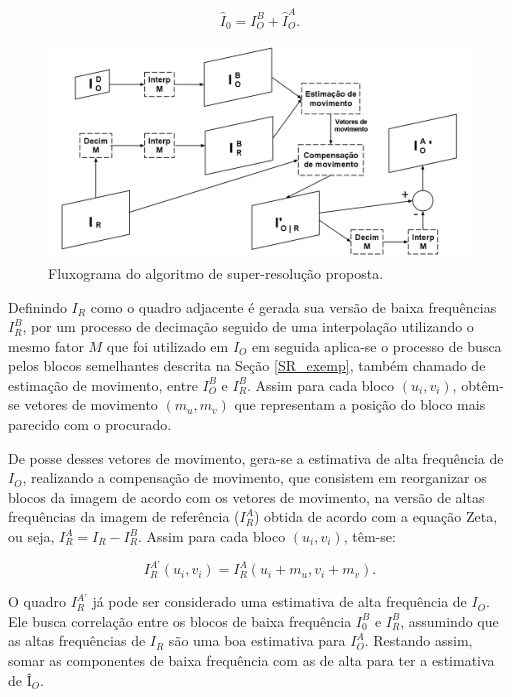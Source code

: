 \begin{equation}
\widehat{I}_0 = I_O^B + \widehat{I}_O^A.
\label{eq_HF}
\end{equation}

\begin{figure}[h]
	\centering
	\includegraphics[scale=0.30]{figuras/fluxo_super_resolucao.png}
	\caption{Fluxograma do algoritmo de super-resolução proposta.}
	\label{fig:algoritmo_proposto}
\end{figure}

Definindo $I_R$ como o quadro adjacente é gerada sua versão de baixa frequências $I_R^B$, por um processo de decimação seguido de uma interpolação utilizando o mesmo fator $M$ que foi utilizado em $I_O$ em seguida aplica-se o processo de busca pelos blocos semelhantes descrita na Seção \ref{SR_exemp}, também chamado de estimação de movimento, entre $I_O^B$ e $I_R^B$. Assim para cada bloco $(u_i,v_i)$, obtêm-se vetores de movimento $(m_u,m_v)$ que representam a posição do bloco mais parecido com o procurado. 

    De posse desses vetores de movimento, gera-se a estimativa de alta frequência de $I_O$, realizando a compensação de movimento, que consistem em reorganizar os blocos da imagem de acordo com os vetores de movimento, na versão de altas frequências da imagem de referência ($I_R^{A}$) obtida de acordo com a equação Zeta, ou seja, $I_R^{A} = I_R - I_R^B$. Assim para cada bloco $(u_i,v_i)$, têm-se:

\begin{equation}
I_R^{A’} (u_i,v_i) = I_R^A(u_i+m_u, v_i+m_v).
\end{equation}


O quadro $I_R^{A’} $ já pode ser considerado uma estimativa de alta frequência de $I_O$. Ele busca correlação entre os blocos de baixa frequência $I_0^B$ e $I_R^B$, assumindo que as altas frequências de $I_R$ são uma boa estimativa para $I_O^A$. Restando assim, somar as componentes de baixa frequência com as de alta para ter a estimativa de $Î_O$.